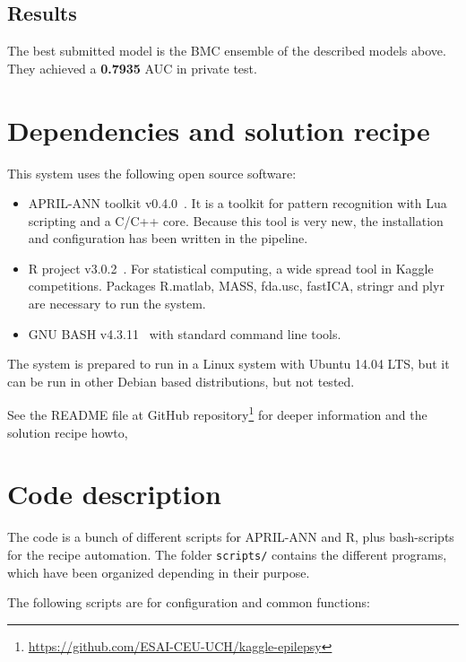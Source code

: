 \documentclass[a4paper,english,twoside]{article}
\begin{document}
\subsection{Results}\label{results}

The best submitted model is the BMC ensemble of the described models
above. They achieved a \textbf{0.7935} AUC in private test.

\section{Dependencies and solution recipe}\label{dependencies}

This system uses the following open source software:

\begin{itemize}
\item APRIL-ANN toolkit v0.4.0~\cite{aprilann}. It is a toolkit for pattern
  recognition with Lua scripting and a C/C++ core.  Because this tool is very
  new, the installation and configuration has been written in the pipeline.
\item R project v3.0.2~\cite{Rproject}. For statistical
  computing, a wide spread tool in Kaggle competitions. Packages
  R.matlab, MASS, fda.usc, fastICA, stringr and plyr are necessary to
  run the system.
\item GNU BASH v4.3.11~\cite{bash} with standard command line tools.
\end{itemize}

The system is prepared to run in a Linux system with Ubuntu 14.04 LTS, but it
can be run in other Debian based distributions, but not tested.

See the README file at GitHub
repository\footnote{\url{https://github.com/ESAI-CEU-UCH/kaggle-epilepsy}} for
deeper information and the solution recipe howto,

\section{Code description}\label{code-description}

The code is a bunch of different scripts for APRIL-ANN and R, plus bash-scripts
for the recipe automation. The folder \verb+scripts/+ contains the different
programs, which have been organized depending in their purpose.

The following scripts are for configuration and common functions:
\end{document}
